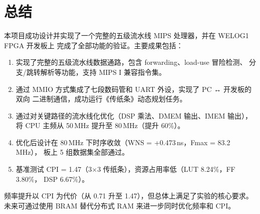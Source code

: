 \documentclass[12pt,a4paper]{ctexart}
\begin{document}
\section{总结}

本项目成功设计并实现了一个完整的五级流水线 MIPS 处理器，并在 WELOG1 FPGA 开发板上
完成了全部功能的验证。主要成果包括：

\begin{enumerate}[nosep]
  \item 实现了完整的五级流水线数据通路，包含 forwarding、load-use 冒险检测、
  分支/跳转解析等功能，支持 MIPS I 兼容指令集。
  \item 通过 MMIO 方式集成了七段数码管和 UART 外设，实现了 PC ↔ 开发板的双向
  二进制通信，成功运行《传纸条》动态规划任务。
  \item 通过对关键路径的流水线化优化（DSP 乘法、DMEM 输出、IMEM 输出），
  将 CPU 主频从 50\,MHz 提升至 80\,MHz（提升 60\%）。
  \item 优化后设计在 80\,MHz 下时序收敛（WNS = +0.473\,ns，Fmax = 83.2\,MHz），
  板上 5 组数据集全部通过。
  \item 基准测试 CPI = 1.47（3×3 传纸条），资源占用率低（LUT 8.24\%，FF 3.80\%，
  DSP 6.67\%）。
\end{enumerate}

频率提升以 CPI 为代价（从 0.71 升至 1.47），但总体上满足了实验的核心要求。
未来可通过使用 BRAM 替代分布式 RAM 来进一步同时优化频率和 CPI。
\end{document}

